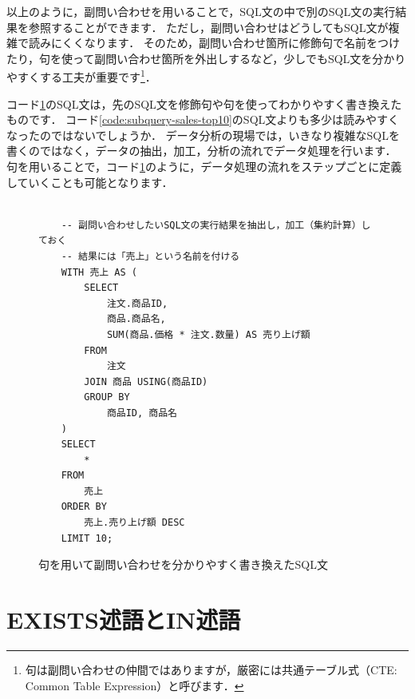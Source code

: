 以上のように，副問い合わせを用いることで，SQL文の中で別のSQL文の実行結果を参照することができます．
ただし，副問い合わせはどうしてもSQL文が複雑で読みにくくなります．
そのため，副問い合わせ箇所に修飾句で名前をつけたり，句を使って副問い合わせ箇所を外出しするなど，少しでもSQL文を分かりやすくする工夫が重要です\footnote{句は副問い合わせの仲間ではありますが，厳密には共通テーブル式（CTE: Common Table Expression）と呼びます．}．

コード\ref{code:subquery-sales-top10-with-with}のSQL文は，先のSQL文を修飾句や句を使ってわかりやすく書き換えたものです．
コード\ref{code:subquery-sales-top10}のSQL文よりも多少は読みやすくなったのではないでしょうか．
データ分析の現場では，いきなり複雑なSQLを書くのではなく，データの抽出，加工，分析の流れでデータ処理を行います．
句を用いることで，コード\ref{code:subquery-sales-top10-with-with}のように，データ処理の流れをステップごとに定義していくことも可能となります．
\begin{figure}[!htbp]
    \begin{verbatim}

    -- 副問い合わせしたいSQL文の実行結果を抽出し，加工（集約計算）しておく
    -- 結果には「売上」という名前を付ける
    WITH 売上 AS (
        SELECT
            注文.商品ID,
            商品.商品名,
            SUM(商品.価格 * 注文.数量) AS 売り上げ額
        FROM
            注文
        JOIN 商品 USING(商品ID)
        GROUP BY
            商品ID, 商品名
    )
    SELECT
        *
    FROM
        売上
    ORDER BY
        売上.売り上げ額 DESC
    LIMIT 10;

    \end{verbatim}
    \captionsetup{name=コード}
    \caption{句を用いて副問い合わせを分かりやすく書き換えたSQL文}
    \label{code:subquery-sales-top10-with-with}
\end{figure}

\section{EXISTS述語とIN述語}
